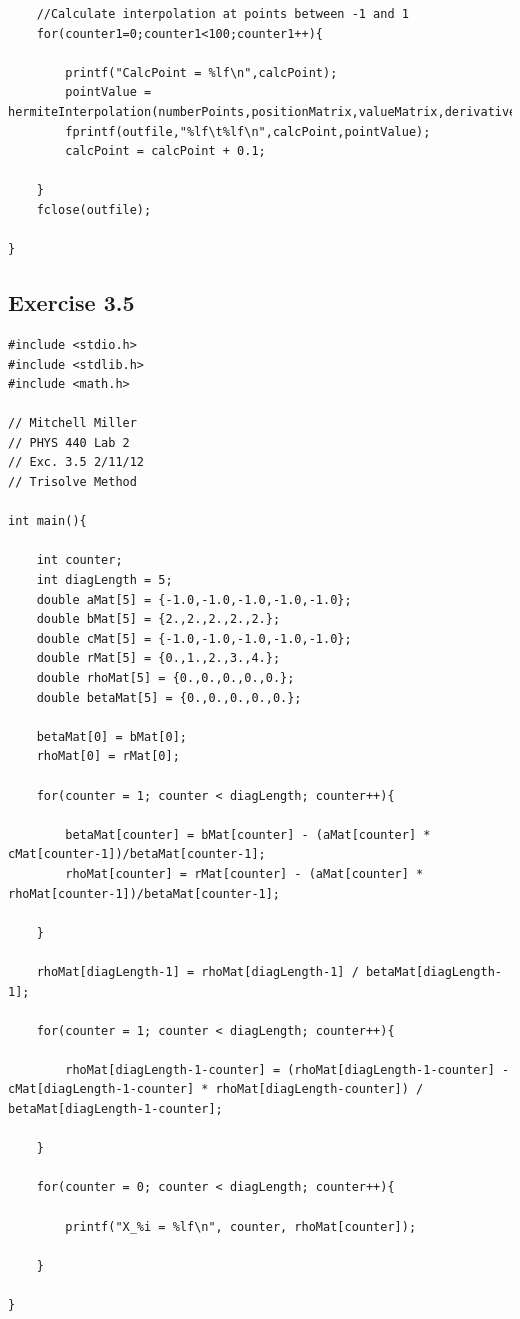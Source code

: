 \documentclass[12pt]{article}
\begin{document}
\begin{verbatim}
	//Calculate interpolation at points between -1 and 1
	for(counter1=0;counter1<100;counter1++){
		
		printf("CalcPoint = %lf\n",calcPoint);
		pointValue = hermiteInterpolation(numberPoints,positionMatrix,valueMatrix,derivativeMatrix,calcPoint);
		fprintf(outfile,"%lf\t%lf\n",calcPoint,pointValue);
		calcPoint = calcPoint + 0.1;

	}
	fclose(outfile);

}
\end{verbatim}
\subsection{Exercise 3.5}
\begin{verbatim}
#include <stdio.h>
#include <stdlib.h>
#include <math.h>

// Mitchell Miller
// PHYS 440 Lab 2
// Exc. 3.5 2/11/12
// Trisolve Method

int main(){

	int counter;
	int diagLength = 5;
	double aMat[5] = {-1.0,-1.0,-1.0,-1.0,-1.0};
	double bMat[5] = {2.,2.,2.,2.,2.};
	double cMat[5] = {-1.0,-1.0,-1.0,-1.0,-1.0};
	double rMat[5] = {0.,1.,2.,3.,4.};
	double rhoMat[5] = {0.,0.,0.,0.,0.};
	double betaMat[5] = {0.,0.,0.,0.,0.};

	betaMat[0] = bMat[0];
	rhoMat[0] = rMat[0];

	for(counter = 1; counter < diagLength; counter++){

		betaMat[counter] = bMat[counter] - (aMat[counter] * cMat[counter-1])/betaMat[counter-1];
		rhoMat[counter] = rMat[counter] - (aMat[counter] * rhoMat[counter-1])/betaMat[counter-1];

	}

	rhoMat[diagLength-1] = rhoMat[diagLength-1] / betaMat[diagLength-1];

	for(counter = 1; counter < diagLength; counter++){

		rhoMat[diagLength-1-counter] = (rhoMat[diagLength-1-counter] - cMat[diagLength-1-counter] * rhoMat[diagLength-counter]) / betaMat[diagLength-1-counter];

	}

	for(counter = 0; counter < diagLength; counter++){

		printf("X_%i = %lf\n", counter, rhoMat[counter]);

	}

}
\end{verbatim}
\end{document}
